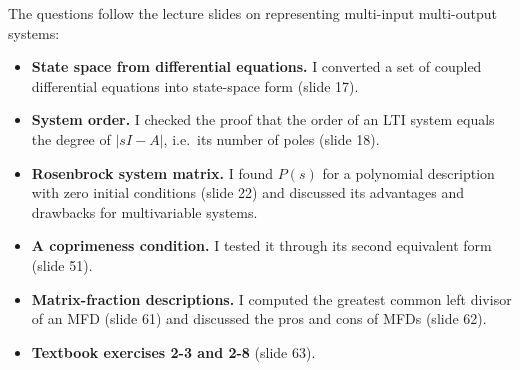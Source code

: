


The questions follow the lecture slides on representing multi-input multi-output systems:
\begin{itemize}
  \item \textbf{State space from differential equations.} I converted a set of coupled differential equations into state-space form (slide 17).
  \item \textbf{System order.} I checked the proof that the order of an LTI system equals the degree of $|sI-A|$, i.e.\ its number of poles (slide 18).
  \item \textbf{Rosenbrock system matrix.} I found $P(s)$ for a polynomial description with zero initial conditions (slide 22) and discussed its advantages and drawbacks for multivariable systems.
  \item \textbf{A coprimeness condition.} I tested it through its second equivalent form (slide 51).
  \item \textbf{Matrix-fraction descriptions.} I computed the greatest common left divisor of an MFD (slide 61) and discussed the pros and cons of MFDs (slide 62).
  \item \textbf{Textbook exercises 2-3 and 2-8} (slide 63).
\end{itemize}

